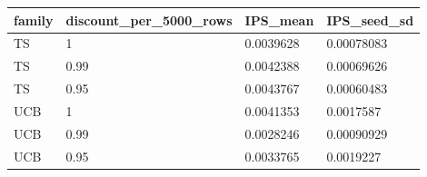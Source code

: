 \begin{tabular}{llll}
\hline
family & discount\_per\_5000\_rows & IPS\_mean & IPS\_seed\_sd \\
\hline
TS & 1 & 0.0039628 & 0.00078083 \\
TS & 0.99 & 0.0042388 & 0.00069626 \\
TS & 0.95 & 0.0043767 & 0.00060483 \\
UCB & 1 & 0.0041353 & 0.0017587 \\
UCB & 0.99 & 0.0028246 & 0.00090929 \\
UCB & 0.95 & 0.0033765 & 0.0019227 \\
\hline
\end{tabular}